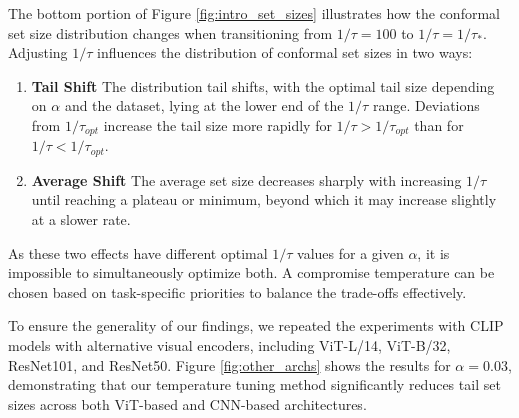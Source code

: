 The bottom portion of Figure \ref{fig:intro_set_sizes} illustrates how the conformal set size distribution changes when transitioning from $1/\tau=100$ to $1/\tau=1/\tau_*$. Adjusting $1/\tau$ influences the distribution of conformal set sizes in two ways:
\begin{enumerate}
    \item \textbf{Tail Shift} The distribution tail shifts, with the optimal tail size depending on $\alpha$ and the dataset, lying at the lower end of the $1/\tau$ range. Deviations from $1/\tau_{opt}$ increase the tail size more rapidly for $1/\tau > 1/\tau_{opt}$ than for $1/\tau < 1/\tau_{opt}$.
    \newpage
    \item \textbf{Average Shift} The average set size decreases sharply with increasing $1/\tau$ until reaching a plateau or minimum, beyond which it may increase slightly at a slower rate.
\end{enumerate}


As these two effects have different optimal $1/\tau$ values for a given $\alpha$, it is impossible to simultaneously optimize both. A compromise temperature can be chosen based on task-specific priorities to balance the trade-offs effectively.

To ensure the generality of our findings, we repeated the experiments with CLIP models with alternative visual encoders, including ViT-L/14, ViT-B/32, ResNet101, and ResNet50. Figure \ref{fig:other_archs} shows the results for $\alpha=0.03$, demonstrating that our temperature tuning method significantly reduces tail set sizes across both ViT-based and CNN-based architectures.


